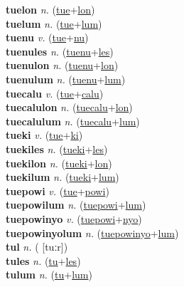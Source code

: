 \textbf{tuelon} \textit{n.} (\hyperref[tue]{tue}+\hyperref[lon]{lon})
 \label{tuelon} \\
\textbf{tuelum} \textit{n.} (\hyperref[tue]{tue}+\hyperref[lum]{lum})
 \label{tuelum} \\
\textbf{tuenu} \textit{v.} (\hyperref[tue]{tue}+\hyperref[nu]{nu})
 \label{tuenu} \\
\textbf{tuenules} \textit{n.} (\hyperref[tuenu]{tuenu}+\hyperref[les]{les})
 \label{tuenules} \\
\textbf{tuenulon} \textit{n.} (\hyperref[tuenu]{tuenu}+\hyperref[lon]{lon})
 \label{tuenulon} \\
\textbf{tuenulum} \textit{n.} (\hyperref[tuenu]{tuenu}+\hyperref[lum]{lum})
 \label{tuenulum} \\
\textbf{tuecalu} \textit{v.} (\hyperref[tue]{tue}+\hyperref[calu]{calu})
 \label{tuecalu} \\
\textbf{tuecalulon} \textit{n.} (\hyperref[tuecalu]{tuecalu}+\hyperref[lon]{lon})
 \label{tuecalulon} \\
\textbf{tuecalulum} \textit{n.} (\hyperref[tuecalu]{tuecalu}+\hyperref[lum]{lum})
 \label{tuecalulum} \\
\textbf{tueki} \textit{v.} (\hyperref[tue]{tue}+\hyperref[ki]{ki})
 \label{tueki} \\
\textbf{tuekiles} \textit{n.} (\hyperref[tueki]{tueki}+\hyperref[les]{les})
 \label{tuekiles} \\
\textbf{tuekilon} \textit{n.} (\hyperref[tueki]{tueki}+\hyperref[lon]{lon})
 \label{tuekilon} \\
\textbf{tuekilum} \textit{n.} (\hyperref[tueki]{tueki}+\hyperref[lum]{lum})
 \label{tuekilum} \\
\textbf{tuepowi} \textit{v.} (\hyperref[tue]{tue}+\hyperref[powi]{powi})
 \label{tuepowi} \\
\textbf{tuepowilum} \textit{n.} (\hyperref[tuepowi]{tuepowi}+\hyperref[lum]{lum})
 \label{tuepowilum} \\
\textbf{tuepowinyo} \textit{v.} (\hyperref[tuepowi]{tuepowi}+\hyperref[nyo]{nyo})
 \label{tuepowinyo} \\
\textbf{tuepowinyolum} \textit{n.} (\hyperref[tuepowinyo]{tuepowinyo}+\hyperref[lum]{lum})
 \label{tuepowinyolum} \\
\textbf{tul} \textit{n.} ( [tuːr])
 \label{tul} \\
\textbf{tules} \textit{n.} (\hyperref[tu]{tu}+\hyperref[les]{les})
 \label{tules} \\
\textbf{tulum} \textit{n.} (\hyperref[tu]{tu}+\hyperref[lum]{lum})
